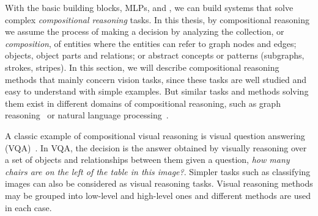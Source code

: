 With the basic building blocks, MLPs, \cnns and \gnns, we can build systems that solve complex \textit{compositional reasoning} tasks. In this thesis, by compositional reasoning we assume the process of making a decision by analyzing the collection, or \textit{composition}, of entities where the entities can refer to graph nodes and edges; objects, object parts and relations; or abstract concepts or patterns (\eg subgraphs, strokes, stripes).
In this section, we will describe compositional reasoning methods that mainly concern vision tasks, since these tasks are well studied and easy to understand with simple examples. But similar tasks and methods solving them exist in different domains of compositional reasoning, such as graph reasoning~\citep{hamilton2018embedding} or natural language processing~\citep{lake2018generalization}.

A classic example of compositional visual reasoning is visual question answering (VQA)~\citep{antol2015vqa}. In VQA, the decision is the answer obtained by visually reasoning over a set of objects and relationships between them given a question, \eg \textit{how many chairs are on the left of the table in this image?}. Simpler tasks such as classifying images can also be considered as visual reasoning tasks. Visual reasoning methods may be grouped into low-level and high-level ones and different methods are used in each case. 

